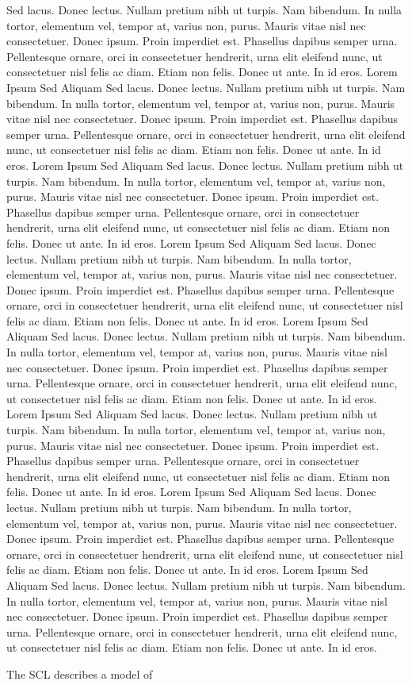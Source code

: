  
Sed lacus. Donec lectus. Nullam pretium nibh ut turpis. Nam bibendum. In nulla
tortor, elementum vel, tempor at, varius non, purus. Mauris vitae nisl nec consectetuer. Donec ipsum. Proin imperdiet est. Phasellus dapibus semper urna. Pellentesque ornare, orci in consectetuer hendrerit, urna elit eleifend nunc, ut consectetuer nisl felis ac diam. Etiam non felis. Donec ut ante. In id eros. Lorem Ipsum Sed Aliquam
Sed lacus. Donec lectus. Nullam pretium nibh ut turpis. Nam bibendum. In nulla tortor, elementum vel, tempor at, varius non, purus. Mauris vitae nisl nec consectetuer. Donec ipsum. Proin imperdiet est. Phasellus dapibus semper urna. Pellentesque ornare, orci in consectetuer hendrerit, urna elit eleifend nunc, ut consectetuer nisl felis ac diam. Etiam non felis. Donec ut ante. In id eros.
Lorem Ipsum Sed Aliquam
Sed lacus. Donec lectus. Nullam pretium nibh ut turpis. Nam bibendum. In nulla tortor, elementum vel, tempor at, varius non, purus. Mauris vitae nisl nec consectetuer. Donec ipsum. Proin imperdiet est. Phasellus dapibus semper urna. Pellentesque ornare, orci in consectetuer hendrerit, urna elit eleifend nunc, ut consectetuer nisl felis ac diam. Etiam non felis. Donec ut ante. In id eros.
Lorem Ipsum Sed Aliquam
Sed lacus. Donec lectus. Nullam pretium nibh ut turpis. Nam bibendum. In nulla tortor, elementum vel, tempor at, varius non, purus. Mauris vitae nisl nec consectetuer. Donec ipsum. Proin imperdiet est. Phasellus dapibus semper urna. Pellentesque ornare, orci in consectetuer hendrerit, urna elit eleifend nunc, ut consectetuer nisl felis ac diam. Etiam non felis. Donec ut ante. In id eros.
Lorem Ipsum Sed Aliquam
Sed lacus. Donec lectus. Nullam pretium nibh ut turpis. Nam bibendum. In nulla tortor, elementum vel, tempor at, varius non, purus. Mauris vitae nisl nec consectetuer. Donec ipsum. Proin imperdiet est. Phasellus dapibus semper urna. Pellentesque ornare, orci in consectetuer hendrerit, urna elit eleifend nunc, ut consectetuer nisl felis ac diam. Etiam non felis. Donec ut ante. In id eros.
Lorem Ipsum Sed Aliquam
Sed lacus. Donec lectus. Nullam pretium nibh ut turpis. Nam bibendum. In nulla tortor, elementum vel, tempor at, varius non, purus. Mauris vitae nisl nec consectetuer. Donec ipsum. Proin imperdiet est. Phasellus dapibus semper urna. Pellentesque ornare, orci in consectetuer hendrerit, urna elit eleifend nunc, ut consectetuer nisl felis ac diam. Etiam non felis. Donec ut ante. In id eros.
Lorem Ipsum Sed Aliquam
Sed lacus. Donec lectus. Nullam pretium nibh ut turpis. Nam bibendum. In nulla tortor, elementum vel, tempor at, varius non, purus. Mauris vitae nisl nec consectetuer. Donec ipsum. Proin imperdiet est. Phasellus dapibus semper urna. Pellentesque ornare, orci in consectetuer hendrerit, urna elit eleifend nunc, ut consectetuer nisl felis ac diam. Etiam non felis. Donec ut ante. In id eros.
Lorem Ipsum Sed Aliquam
Sed lacus. Donec lectus. Nullam pretium nibh ut turpis. Nam bibendum. In nulla tortor, elementum vel, tempor at, varius non, purus. Mauris vitae nisl nec consectetuer. Donec ipsum. Proin imperdiet est. Phasellus dapibus semper urna. Pellentesque ornare, orci in consectetuer hendrerit, urna elit eleifend nunc, ut consectetuer nisl felis ac diam. Etiam non felis. Donec ut ante. In id eros.
 

The SCL describes a model of  